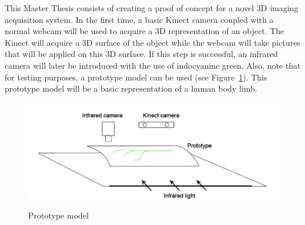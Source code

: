 This Master Thesis consists of creating a proof of concept for a novel 3D imaging acquisition system. In the first time, a basic Kinect camera coupled with a normal webcam will be used to acquire a 3D representation of an object. The Kinect will acquire a 3D surface of the object while the webcam will take pictures that will be applied on this 3D surface. If this step is successful, an infrared camera will later be introduced with the use of indocyanine green. Also, note that for testing purposes, a prototype model can be used (see Figure~\ref{fig:prototype}). This prototype model will be a basic representation of a human body limb.

 \begin{figure}[h]
\caption{Prototype model}
\centering
    \includegraphics[width=1.0\textwidth]{images/prototype.png}
\label{fig:prototype}
\end{figure}